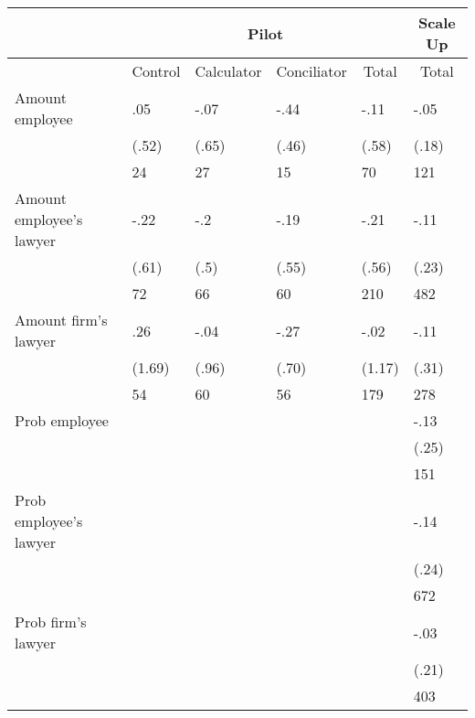 \begin{tabular}{rlllll}
\toprule
      & \multicolumn{4}{c}{Pilot}     & \multicolumn{1}{c}{Scale Up} \\
\midrule
      & \multicolumn{1}{c}{Control} & \multicolumn{1}{c}{Calculator} & \multicolumn{1}{c}{Conciliator} & \multicolumn{1}{c}{Total} & \multicolumn{1}{c}{Total} \\
\midrule
\midrule
\multicolumn{1}{l}{Amount employee} & .05   & -.07  & -.44  & -.11  & -.05 \\
      & (.52) & (.65) & (.46) & (.58) & (.18) \\
      & 24    & 27    & 15    & 70    & 121 \\
\multicolumn{1}{l}{Amount employee's lawyer} & -.22  & -.2   & -.19  & -.21  & -.11 \\
      & (.61) & (.5)  & (.55) & (.56) & (.23) \\
      & 72    & 66    & 60    & 210   & 482 \\
\multicolumn{1}{l}{Amount firm's lawyer} & .26   & -.04  & -.27  & -.02  & -.11 \\
      & (1.69) & (.96) & (.70) & (1.17) & (.31) \\
      & 54    & 60    & 56    & 179   & 278 \\
\multicolumn{1}{l}{Prob employee} &       &       &       &       & -.13 \\
      &       &       &       &       & (.25) \\
      &       &       &       &       & 151 \\
\multicolumn{1}{l}{Prob employee's lawyer} &       &       &       &       & -.14 \\
      &       &       &       &       & (.24) \\
      &       &       &       &       & 672 \\
\multicolumn{1}{l}{Prob firm's lawyer} &       &       &       &       & -.03 \\
      &       &       &       &       & (.21) \\
      &       &       &       &       & 403 \\
\bottomrule
\bottomrule
\end{tabular}%
